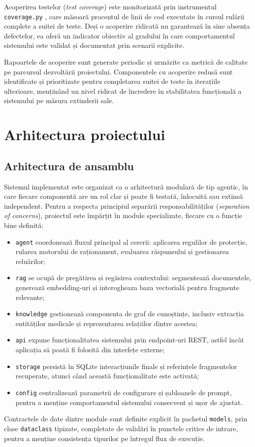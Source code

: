 \documentclass[12pt, a4paper, oneside, romanian]{teza-upb}
\begin{document}
Acoperirea testelor (\textit{test coverage}) este monitorizată prin instrumentul \texttt{coverage.py} \cite{coveragepy_doc}, care măsoară procentul de linii de cod executate în cursul rulării complete a suitei de teste. Deși o acoperire ridicată nu garantează în sine absența defectelor, ea oferă un indicator obiectiv al gradului în care comportamentul sistemului este validat și documentat prin scenarii explicite.

Rapoartele de acoperire sunt generate periodic și urmărite ca metrică de calitate pe parcursul dezvoltării proiectului. Componentele cu acoperire redusă sunt identificate și prioritizate pentru completarea suitei de teste în iterațiile ulterioare, menținând un nivel ridicat de încredere în stabilitatea funcțională a sistemului pe măsura extinderii sale.

\chapter{Arhitectura proiectului}

\section{Arhitectura de ansamblu}
\label{sec:ansamblu}

Sistemul implementat este organizat ca o arhitectură modulară de tip agentic, în care fiecare componentă are un rol clar și poate fi testată, înlocuită sau extinsă independent. Pentru a respecta principiul separării responsabilităților (\textit{separation of concerns}), proiectul este împărțit în module specializate, fiecare cu o funcție bine definită:
\begin{itemize}
    \item \texttt{agent} coordonează fluxul principal al cererii: aplicarea regulilor de protecție, rularea motorului de raționament, evaluarea răspunsului și gestionarea reluărilor;
    \item \texttt{rag} se ocupă de pregătirea și regăsirea contextului: segmentează documentele, generează embedding-uri și interogheaza baza vectorială pentru fragmente relevante;
    \item \texttt{knowledge} gestionează componenta de graf de cunoștințe, inclusiv extracția entităților medicale și reprezentarea relațiilor dintre acestea;
    \item \texttt{api} expune funcționalitatea sistemului prin endpoint-uri REST, astfel încât aplicația să poată fi folosită din interfețe externe;
    \item \texttt{storage} persistă în SQLite interacțiunile finale și referințele fragmentelor recuperate, atunci când această funcționalitate este activată;
    \item \texttt{config} centralizează parametrii de configurare și șabloanele de prompt, pentru a menține comportamentul sistemului consecvent și ușor de ajustat.
\end{itemize}
Contractele de date dintre module sunt definite explicit în pachetul \texttt{models}, prin clase \texttt{dataclass} tipizate, completate de validări în punctele critice de intrare, pentru a menține consistența tipurilor pe întregul flux de execuție.
\end{document}
